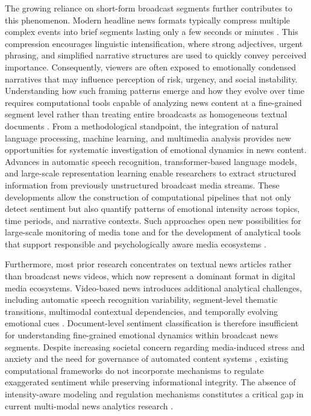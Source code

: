 \documentclass[final,1p,times]{elsarticle}
\begin{document}
The growing reliance on short-form broadcast segments further contributes to this phenomenon. Modern headline news formats typically compress multiple complex events into brief segments lasting only a few seconds or minutes \cite{fahima2025sentiment}. This compression encourages linguistic intensification, where strong adjectives, urgent phrasing, and simplified narrative structures are used to quickly convey perceived importance. Consequently, viewers are often exposed to emotionally condensed narratives that may influence perception of risk, urgency, and social instability. Understanding how such framing patterns emerge and how they evolve over time requires computational tools capable of analyzing news content at a fine-grained segment level rather than treating entire broadcasts as homogeneous textual documents \cite{bednarek2025attitude}. From a methodological standpoint, the integration of natural language processing, machine learning, and multimedia analysis provides new opportunities for systematic investigation of emotional dynamics in news content. Advances in automatic speech recognition, transformer-based language models, and large-scale representation learning enable researchers to extract structured information from previously unstructured broadcast media streams. These developments allow the construction of computational pipelines that not only detect sentiment but also quantify patterns of emotional intensity across topics, time periods, and narrative contexts. Such approaches open new possibilities for large-scale monitoring of media tone and for the development of analytical tools that support responsible and psychologically aware media ecosystems \cite{castillo2025media}.

Furthermore, most prior research concentrates on textual news articles rather than broadcast news videos, which now represent a dominant format in digital media ecosystems. Video-based news introduces additional analytical challenges, including automatic speech recognition variability, segment-level thematic transitions, multimodal contextual dependencies, and temporally evolving emotional cues \cite{navarrete2025closer}. Document-level sentiment classification is therefore insufficient for understanding fine-grained emotional dynamics within broadcast news segments. Despite increasing societal concern regarding media-induced stress and anxiety and the need for governance of automated content systems \cite{waldman2022governing}, existing computational frameworks do not incorporate mechanisms to regulate exaggerated sentiment while preserving informational integrity. The absence of intensity-aware modeling and regulation mechanisms constitutes a critical gap in current multi-modal news analytics research \cite{wang2025cross}.
\end{document}
